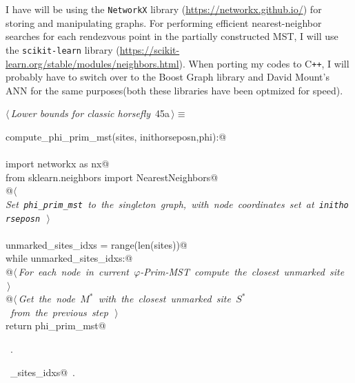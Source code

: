 \documentclass[11.5pt]{report}
\begin{document}
I have will be using the \verb|NetworkX| library (\url{https://networkx.github.io/}) for 
storing and manipulating graphs. For performing efficient nearest-neighbor searches for 
each rendezvous point in the partially constructed MST, I will use the \verb|scikit-learn| 
library (\url{https://scikit-learn.org/stable/modules/neighbors.html}). When porting 
my codes to C\texttt{++}, I will probably have to switch over to the Boost Graph library and 
David Mount's ANN for the same purposes(both these libraries have been optmized for speed). 
\begin{flushleft} \small
\begin{minipage}{\linewidth}\label{scrap65}\raggedright\small
{} $\langle\,${\itshape Lower bounds for classic horsefly}\nobreak\ {\footnotesize {45a}}$\,\rangle\equiv$
\vspace{-1ex}
\begin{list}{}{} \item
\mbox{}\verb@def compute_phi_prim_mst(sites, inithorseposn,phi):@\\
\mbox{}\verb@@\\
\mbox{}\verb@     import networkx as nx@\\
\mbox{}\verb@     from sklearn.neighbors import NearestNeighbors@\\
\mbox{}\verb@     @\hbox{$\langle\,${\itshape Set \verb|phi_prim_mst| to the singleton graph, with node coordinates set at \verb|inithorseposn|}\nobreak\ {\footnotesize {}}$\,\rangle$}\verb@@\\
\mbox{}\verb@@\\
\mbox{}\verb@     unmarked_sites_idxs = range(len(sites))@\\
\mbox{}\verb@     while unmarked_sites_idxs:@\\
\mbox{}\verb@          @\hbox{$\langle\,${\itshape For each node in current $\varphi$-Prim-MST compute the closest unmarked site}\nobreak\ {\footnotesize {}}$\,\rangle$}\verb@@\\
\mbox{}\verb@          @\hbox{$\langle\,${\itshape Get the node $M^{*}$ with the closest unmarked site $S^{*}$ from the previous step}\nobreak\ {\footnotesize {}}$\,\rangle$}\verb@@\\
\mbox{}\verb@     return phi_prim_mst@\\
\mbox{}\verb@@{\NWsep}
\end{list}
\vspace{-1.5ex}
\footnotesize
\begin{list}{}{\setlength{\itemsep}{-\parsep}\setlength{\itemindent}{-\leftmargin}}
\item \NWtxtMacroRefIn\ .
\item \NWtxtIdentsDefed\nobreak\  \verb@unmarked_sites_idxs@\nobreak\ .
\item{}
\end{list}
\end{minipage}\vspace{4ex}
\end{flushleft}
\end{document}
